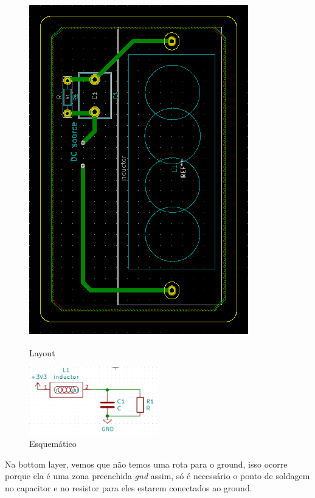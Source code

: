 \begin{figure}[!htb]
\begin{minipage}{0.5\textwidth}
    \includegraphics[scale = 0.5]{PCB_3.png}
    \caption{Layout}
    \end{minipage}\hfill
    \begin{minipage}{0.5\textwidth}
    \centering
    \includegraphics[width = 0.5\textwidth]{PCB_4.png}
    \caption{Esquemático}
    \end{minipage}\hfill
\end{figure}

\clearpage
Na bottom layer, vemos que não temos uma rota para o ground, isso ocorre porque ela é uma zona preenchida \textit{gnd} assim, só é necessário o ponto de soldagem no capacitor e no resistor para eles estarem conectados ao ground.


